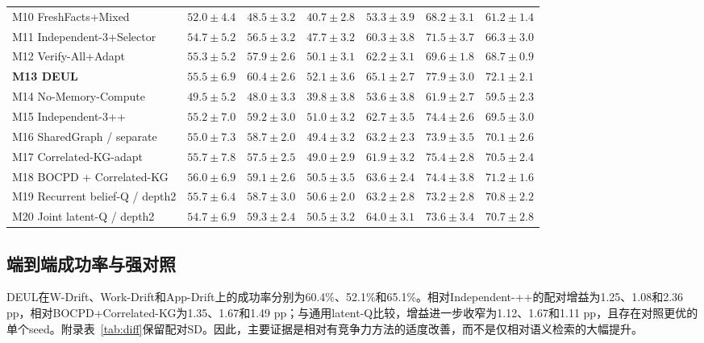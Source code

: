 \documentclass[sigconf,anonymous,review]{acmart}
\theoremstyle{zhplain}
\begin{document}
\begin{table}[t]
\begin{tabular}{@{}lrrrrrr@{}}
M10 FreshFacts+Mixed & \(52.0\!\pm\!4.4\) & \(48.5\!\pm\!3.2\) & \(40.7\!\pm\!2.8\) & \(53.3\!\pm\!3.9\) & \(68.2\!\pm\!3.1\) & \(61.2\!\pm\!1.4\) \\
M11 Independent-3+Selector & \(54.7\!\pm\!5.2\) & \(56.5\!\pm\!3.2\) & \(47.7\!\pm\!3.2\) & \(60.3\!\pm\!3.8\) & \(71.5\!\pm\!3.7\) & \(66.3\!\pm\!3.0\) \\
M12 Verify-All+Adapt & \(55.3\!\pm\!5.2\) & \(57.9\!\pm\!2.6\) & \(50.1\!\pm\!3.1\) & \(62.2\!\pm\!3.1\) & \(69.6\!\pm\!1.8\) & \(68.7\!\pm\!0.9\) \\
\textbf{M13 DEUL} & \(55.5\!\pm\!6.9\) & \(60.4\!\pm\!2.6\) & \(52.1\!\pm\!3.6\) & \(65.1\!\pm\!2.7\) & \(77.9\!\pm\!3.0\) & \(72.1\!\pm\!2.1\) \\
M14 No-Memory-Compute & \(49.5\!\pm\!5.2\) & \(48.0\!\pm\!3.3\) & \(39.8\!\pm\!3.8\) & \(53.6\!\pm\!3.8\) & \(61.9\!\pm\!2.7\) & \(59.5\!\pm\!2.3\) \\
M15 Independent-3++ & \(55.2\!\pm\!7.0\) & \(59.2\!\pm\!3.0\) & \(51.0\!\pm\!3.2\) & \(62.7\!\pm\!3.5\) & \(74.4\!\pm\!2.6\) & \(69.5\!\pm\!3.0\) \\
M16 SharedGraph / separate & \(55.0\!\pm\!7.3\) & \(58.7\!\pm\!2.0\) & \(49.4\!\pm\!3.2\) & \(63.2\!\pm\!2.3\) & \(73.9\!\pm\!3.5\) & \(70.1\!\pm\!2.6\) \\
M17 Correlated-KG-adapt & \(55.7\!\pm\!7.8\) & \(57.5\!\pm\!2.5\) & \(49.0\!\pm\!2.9\) & \(61.9\!\pm\!3.2\) & \(75.4\!\pm\!2.8\) & \(70.5\!\pm\!2.4\) \\
M18 BOCPD + Correlated-KG & \(56.0\!\pm\!6.9\) & \(59.1\!\pm\!2.6\) & \(50.5\!\pm\!3.5\) & \(63.6\!\pm\!2.4\) & \(74.4\!\pm\!3.8\) & \(71.2\!\pm\!1.6\) \\
M19 Recurrent belief-Q / depth2 & \(55.7\!\pm\!6.4\) & \(58.7\!\pm\!3.0\) & \(50.6\!\pm\!2.0\) & \(63.2\!\pm\!2.8\) & \(73.2\!\pm\!2.8\) & \(70.8\!\pm\!2.2\) \\
M20 Joint latent-Q / depth2 & \(54.7\!\pm\!6.9\) & \(59.3\!\pm\!2.4\) & \(50.5\!\pm\!3.2\) & \(64.0\!\pm\!3.1\) & \(73.6\!\pm\!3.4\) & \(70.7\!\pm\!2.8\) \\
\bottomrule
\end{tabular}
\end{table}

\subsection{端到端成功率与强对照}
DEUL在W-Drift、Work-Drift和App-Drift上的成功率分别为60.4\%、52.1\%和65.1\%。相对Independent-++的配对增益为1.25、1.08和2.36 pp，相对BOCPD+\allowbreak Correlated-KG为1.35、1.67和1.49 pp；与通用latent-Q比较，增益进一步收窄为1.12、1.67和1.11 pp，且存在对照更优的单个seed。附录表~\ref{tab:diff}保留配对SD。因此，主要证据是相对有竞争力方法的适度改善，而不是仅相对语义检索的大幅提升。
\end{document}
